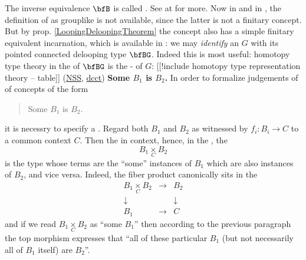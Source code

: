\documentclass[12pt,titlepage]{article}
\newcommand{\itexarray}[1]{\begin{matrix}#1\end{matrix}}
\theoremstyle{plain}
\theoremstyle{definition}
\theoremstyle{remark}
\begin{document}
The inverse equivalence $\bfB$ is called . See at  for more.
Now in  and in , the definition of  as grouplike  is not available, since the latter is not a finitary concept. But by prop. \ref{LoopingDeloopingTheorem} the concept also has a simple finitary equivalent incarnation, which is available in : we may \emph{identify} an  $G$ with its pointed connected delooping type $\bfBG$.
Indeed this is most useful: homotopy type theory in the  of $\bfBG$ is the - of $G$:
[[!include homotopy type representation theory -- table]]
(\hyperlink{NSS}{NSS}, \hyperlink{dcct}{dcct})
\textbf{Some $B_1$ is $B_2$.}
In order to formalize judgements of  of concepts of the form
\begin{quote}%
Some $B_1$ is $B_2$.
\end{quote}
it is necessry to specify a . Regard both $B_1$ and $B_2$ as  witnessed by 
$f_i \colon B_i \longrightarrow C$
to a common context $C$. Then the  in context, hence, in the , the 
\begin{displaymath}
B_1 \underset{C}{\times} B_2
\end{displaymath}
is the type whose terms are the ``some'' instances of $B_1$ which are also instances of $B_2$, and vice versa. Indeed, the fiber product canonically sits in the  
\begin{displaymath}
\itexarray{
B_1 \underset{C}{\times} B_2
&\longrightarrow&
B_2
\\
\downarrow && \downarrow
\\
B_1 &\longrightarrow& C
}
\end{displaymath}
and if we read $B_1 \underset{C}{\times} B_2$ as ``some $B_1$'' then according to the previous paragraph the top morphism expresses that ``all of these particular $B_1$ (but not necessarily all of $B_1$ itself) are $B_2$''.
\end{document}
